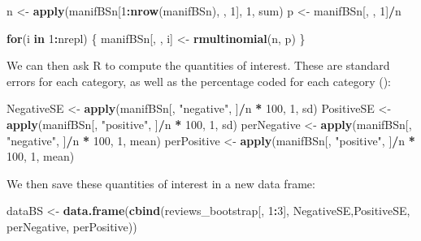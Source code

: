 \documentclass[
]{book}
\newenvironment{Shaded}{\begin{snugshade}}{\end{snugshade}}
\newcommand{\ControlFlowTok}[1]{\textcolor[rgb]{0.13,0.29,0.53}{\textbf{#1}}}
\newcommand{\DecValTok}[1]{\textcolor[rgb]{0.00,0.00,0.81}{#1}}
\newcommand{\FunctionTok}[1]{\textcolor[rgb]{0.13,0.29,0.53}{\textbf{#1}}}
\newcommand{\NormalTok}[1]{#1}
\newcommand{\OtherTok}[1]{\textcolor[rgb]{0.56,0.35,0.01}{#1}}
\newcommand{\SpecialCharTok}[1]{\textcolor[rgb]{0.81,0.36,0.00}{\textbf{#1}}}
\newcommand{\StringTok}[1]{\textcolor[rgb]{0.31,0.60,0.02}{#1}}
\begin{document}
\begin{Shaded}
\begin{Highlighting}[]
\NormalTok{n }\OtherTok{\textless{}{-}} \FunctionTok{apply}\NormalTok{(manifBSn[}\DecValTok{1}\SpecialCharTok{:}\FunctionTok{nrow}\NormalTok{(manifBSn), , }\DecValTok{1}\NormalTok{], }\DecValTok{1}\NormalTok{, sum)}
\NormalTok{p }\OtherTok{\textless{}{-}}\NormalTok{ manifBSn[, , }\DecValTok{1}\NormalTok{]}\SpecialCharTok{/}\NormalTok{n}

\ControlFlowTok{for}\NormalTok{(i }\ControlFlowTok{in} \DecValTok{1}\SpecialCharTok{:}\NormalTok{nrepl) \{}
\NormalTok{ manifBSn[, , i] }\OtherTok{\textless{}{-}} \FunctionTok{rmultinomial}\NormalTok{(n, p)}
\NormalTok{ \}}
\end{Highlighting}
\end{Shaded}

We can then ask R to compute the quantities of interest. These are standard errors for each category, as well as the percentage coded for each category ():

\begin{Shaded}
\begin{Highlighting}[]
\NormalTok{NegativeSE }\OtherTok{\textless{}{-}} \FunctionTok{apply}\NormalTok{(manifBSn[, }\StringTok{"negative"}\NormalTok{, ]}\SpecialCharTok{/}\NormalTok{n }\SpecialCharTok{*} \DecValTok{100}\NormalTok{, }\DecValTok{1}\NormalTok{, sd)}
\NormalTok{PositiveSE }\OtherTok{\textless{}{-}} \FunctionTok{apply}\NormalTok{(manifBSn[, }\StringTok{"positive"}\NormalTok{, ]}\SpecialCharTok{/}\NormalTok{n }\SpecialCharTok{*} \DecValTok{100}\NormalTok{, }\DecValTok{1}\NormalTok{, sd)}
\NormalTok{perNegative }\OtherTok{\textless{}{-}} \FunctionTok{apply}\NormalTok{(manifBSn[, }\StringTok{"negative"}\NormalTok{, ]}\SpecialCharTok{/}\NormalTok{n }\SpecialCharTok{*} \DecValTok{100}\NormalTok{, }\DecValTok{1}\NormalTok{, mean)}
\NormalTok{perPositive }\OtherTok{\textless{}{-}} \FunctionTok{apply}\NormalTok{(manifBSn[, }\StringTok{"positive"}\NormalTok{, ]}\SpecialCharTok{/}\NormalTok{n }\SpecialCharTok{*} \DecValTok{100}\NormalTok{, }\DecValTok{1}\NormalTok{, mean)}
\end{Highlighting}
\end{Shaded}

We then save these quantities of interest in a new data frame:

\begin{Shaded}
\begin{Highlighting}[]
\NormalTok{dataBS }\OtherTok{\textless{}{-}} \FunctionTok{data.frame}\NormalTok{(}\FunctionTok{cbind}\NormalTok{(reviews\_bootstrap[, }\DecValTok{1}\SpecialCharTok{:}\DecValTok{3}\NormalTok{], NegativeSE,PositiveSE, perNegative, perPositive))}
\end{Highlighting}
\end{Shaded}
\end{document}
